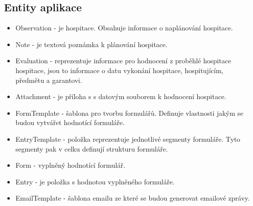 \subsection{Entity aplikace}
\begin{itemize}
\item Observation - je hospitace. Obsahuje informace o naplánování hospitace. 
\item Note - je textová poznámka k plánování hospitace.
\item Evaluation - reprezentuje informace pro hodnocení z proběhlé hospitace hospitace, jsou to informace o datu vykonání hospitace, hospitujícím, předmětu a garantovi.
\item Attachment - je příloha s s datovým souborem k hodnocení hospitace.
\item FormTemplate - šablona pro tvorbu formulářů. Definuje vlastnosti jakým se budou vytvářet hodnotící formuláře.
\item EntryTemplate - položka reprezentuje jednotlivé segmenty formuláře. Tyto segmenty pak v celku definují strukturu formuláře.
\item Form - vyplněný hodnotící formulář.
\item Entry - je položka s hodnotou vyplněného formuláře.
\item EmailTemplate - šablona emailu ze které se budou generovat emailové zprávy.
\end{itemize}

